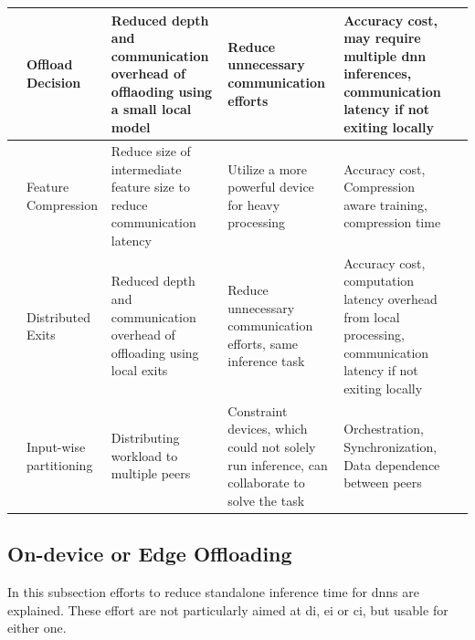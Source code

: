 \begin{minipage}[t]{\linewidth}
\begin{scriptsize}
\begin{longtabu}{>{\bfseries}X[0.8c]|X[c]|X[c]|X[c]|X[c]|X[c]}
	& Offload Decision & Reduced depth and communication overhead of offlaoding using a small local model & Reduce unnecessary communication efforts & Accuracy cost, may require multiple \gls{dnn} inferences, communication latency if not exiting locally & \cite{park_big/little_2015} \tabularnewline
	\hline
		
	 & Feature Compression & Reduce size of intermediate feature size to reduce communication latency & Utilize a more powerful device for heavy processing  & Accuracy cost, Compression aware training, compression time & \cite{kang_neurosurgeon:_2017,choi_near-lossless_2018, choi_deep_2018, eshratifar_bottlenet:_2019} \tabularnewline
	
	& Distributed Exits & Reduced depth and communication overhead of offloading using local exits  &  Reduce unnecessary communication efforts, same inference task & Accuracy cost, computation latency overhead from local processing, communication latency if not exiting locally & \cite{leroux_cascading_2017,teerapittayanon_distributed_2017, li_edge_2018} \tabularnewline\hline
	
	 & Input-wise partitioning & Distributing workload to multiple peers & Constraint devices, which could not solely run inference, can collaborate to solve the task & Orchestration, Synchronization, Data dependence between peers & \cite{mao_modnn:_2017, zhao_deepthings:_2018}
	\tabularnewline

	\bottomrule
\end{longtabu}
\end{scriptsize}
\end{minipage}

\subsection{On-device or Edge Offloading}

In this subsection efforts to reduce standalone inference time for \gls{dnn}s are explained. These effort are not particularly aimed at \gls{di}, \gls{ei} or \gls{ci}, but usable for either one. 

